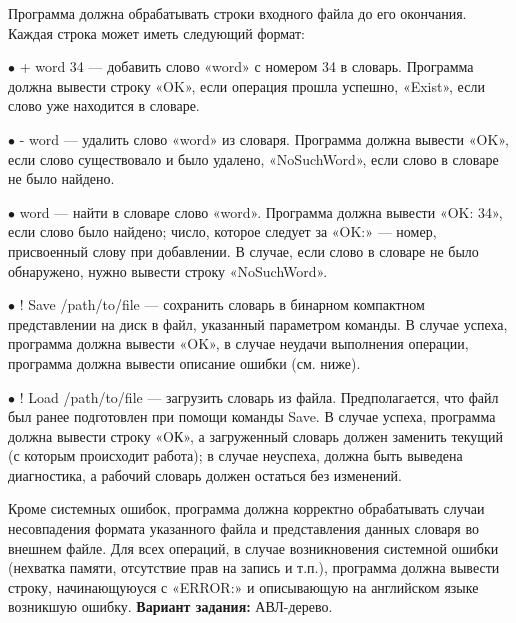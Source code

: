 

Программа должна обрабатывать строки входного файла до его окончания. Каждая строка может иметь следующий формат:

$\bullet$ + word 34 — добавить слово «word» с номером 34 в словарь. Программа должна вывести строку «OK», если операция прошла успешно, «Exist», если слово уже находится в словаре.

$\bullet$ - word — удалить слово «word» из словаря. Программа должна вывести «OK», если слово существовало и было удалено, «NoSuchWord», если слово в словаре не было найдено.

$\bullet$ word — найти в словаре слово «word». Программа должна вывести «OK: 34», если слово было найдено; число, которое следует за «OK:» — номер, присвоенный слову при добавлении. В случае, если слово в словаре не было обнаружено, нужно вывести строку «NoSuchWord».

$\bullet$ ! Save /path/to/file — сохранить словарь в бинарном компактном представлении на диск в файл, указанный параметром команды. В случае успеха, программа должна вывести «OK», в случае неудачи выполнения операции, программа должна вывести описание ошибки (см. ниже).

$\bullet$ ! Load /path/to/file — загрузить словарь из файла. Предполагается, что файл был ранее подготовлен при помощи команды Save. В случае успеха, программа должна вывести строку «OК», а загруженный словарь должен заменить текущий (с которым происходит работа); в случае неуспеха, должна быть выведена диагностика, а рабочий словарь должен остаться без изменений. 

Кроме системных ошибок, программа должна корректно обрабатывать случаи несовпадения формата указанного файла и представления данных словаря во внешнем файле.
Для всех операций, в случае возникновения системной ошибки (нехватка памяти, отсутствие прав на запись и т.п.), программа должна вывести строку, начинающуюуся с «ERROR:» и описывающую на английском языке возникшую ошибку.
{\bfseries Вариант задания:} {\normalfont\ttfamily АВЛ-дерево.}

\pagebreak
